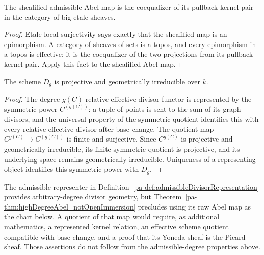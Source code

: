 \begin{theorem}
  \label{pa-thm:admissibleAbel_etaleCoequalizer}
  \leanok

  The sheafified admissible Abel map is the coequalizer of its pullback kernel pair in the
  category of big-etale sheaves.
\end{theorem}
\begin{proof}
  Etale-local surjectivity says exactly that the sheafified map is an epimorphism.  A category
  of sheaves of sets is a topos, and every epimorphism in a topos is effective: it is the
  coequalizer of the two projections from its pullback kernel pair.  Apply this fact to the
  sheafified Abel map.
\end{proof}

\begin{theorem}
  \label{pa-thm:genusDivisorSource_geometry}
  \notready
  The scheme \(D_g\) is projective and geometrically irreducible over \(k\).
\end{theorem}
\begin{proof}
  The degree-\(g(C)\) relative effective-divisor functor is represented by the symmetric power
  \(C^{(g(C))}\): a tuple of points is sent to the sum of its graph divisors, and the universal
  property of the symmetric quotient identifies this with every relative effective divisor
  after base change.  The quotient map \(C^{g(C)}\to C^{(g(C))}\) is finite and surjective.
  Since \(C^{g(C)}\) is projective and geometrically irreducible, its finite symmetric quotient
  is projective, and its underlying space remains geometrically irreducible.  Uniqueness of a
  representing object identifies this symmetric power with \(D_g\).
\end{proof}

The admissible representer in Definition~\ref{pa-def:admissibleDivisorRepresentation} provides
arbitrary-degree divisor geometry, but
Theorem~\ref{pa-thm:highDegreeAbel_notOpenImmersion} precludes using its raw Abel map as the
chart below.  A quotient of that map would require, as additional mathematics, a represented
kernel relation, an effective scheme quotient compatible with base change, and a proof that
its Yoneda sheaf is the Picard sheaf.  Those assertions do not follow from the admissible-degree
properties above.

